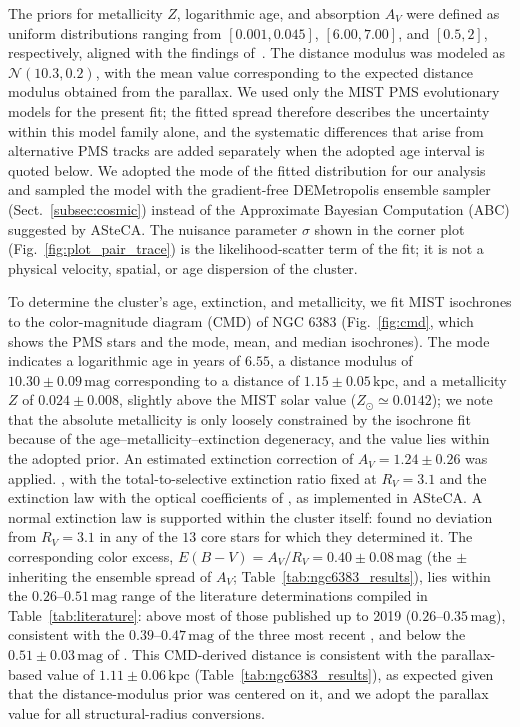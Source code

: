 \documentclass{aa}
\providecommand{\DIFaddtex}[1]{{\protect\color[rgb]{0,0,0.7}#1}} %
\providecommand{\DIFdeltex}[1]{{\protect\color[rgb]{0.65,0,0}\footnotesize #1}} %
\providecommand{\DIFaddbegin}{} %
\providecommand{\DIFaddend}{} %
\providecommand{\DIFdelbegin}{} %
\providecommand{\DIFdelend}{} %
\providecommand{\DIFadd}[1]{\texorpdfstring{\DIFaddtex{#1}}{#1}} %
\providecommand{\DIFdel}[1]{\texorpdfstring{\DIFdeltex{#1}}{}} %
\providecommand{\DIFscaledelfig}{0.5}
\newlength{\DIFdelgraphicswidth} %
\newlength{\DIFdelgraphicsheight} %
\providecommand{\DIFaddincludegraphics}[2][]{{\color{blue}\fbox{\DIFOincludegraphics[#1]{#2}}}} %
\providecommand{\DIFdelincludegraphics}[2][]{%
\sbox{\DIFdelgraphicsbox}{\DIFOincludegraphics[#1]{#2}}%
\settoboxwidth{\DIFdelgraphicswidth}{\DIFdelgraphicsbox} %
\settoboxtotalheight{\DIFdelgraphicsheight}{\DIFdelgraphicsbox} %
\scalebox{\DIFscaledelfig}{%
\parbox[b]{\DIFdelgraphicswidth}{\usebox{\DIFdelgraphicsbox}\\[-\baselineskip] \rule{\DIFdelgraphicswidth}{0em}}\llap{\resizebox{\DIFdelgraphicswidth}{\DIFdelgraphicsheight}{%
\setlength{\unitlength}{\DIFdelgraphicswidth}%
\begin{picture}(1,1)%
\thicklines\linethickness{2pt} %
{\color[rgb]{1,0,0}\put(0,0){\framebox(1,1){}}}%
{\color[rgb]{1,0,0}\put(0,0){\line( 1,1){1}}}%
{\color[rgb]{1,0,0}\put(0,1){\line(1,-1){1}}}%
\end{picture}%
}\hspace*{3pt}}} %
} %
\DeclareRobustCommand{\DIFaddbegin}{\DIFOaddbegin \let\includegraphics\DIFaddincludegraphics} %
\DeclareRobustCommand{\DIFaddend}{\DIFOaddend \let\includegraphics\DIFOincludegraphics} %
\DeclareRobustCommand{\DIFdelbegin}{\DIFOdelbegin \let\includegraphics\DIFdelincludegraphics} %
\DeclareRobustCommand{\DIFdelend}{\DIFOaddend \let\includegraphics\DIFOincludegraphics} %
\begin{document}
The priors for metallicity $Z$, logarithmic age, and absorption $A_V$ were defined as uniform distributions ranging from $[0.001, 0.045]$, $[6.00, 7.00]$, and $[0.5, 2]$, respectively, aligned with the findings of~\citep{2024arXiv240301030P}. The distance modulus was modeled as $\mathcal{N}(10.3, 0.2)$, with the mean value corresponding to the expected distance modulus obtained from the parallax. We used only the \textsc{MIST} PMS evolutionary models for the present fit; the fitted spread therefore describes the uncertainty within this model family alone, and the systematic differences that arise from alternative PMS tracks are added separately when the adopted age interval is quoted below. We adopted the mode of the fitted distribution for our analysis and sampled the model with the gradient-free DEMetropolis ensemble sampler (Sect.~\ref{subsec:cosmic}) instead of the Approximate Bayesian Computation (ABC) suggested by ASteCA\@. The nuisance parameter $\sigma$ shown in the corner plot (Fig.~\ref{fig:plot_pair_trace}) is the likelihood-scatter term of the fit; it is not a physical velocity, spatial, or age dispersion of the cluster.

To determine the cluster's age, extinction, and metallicity, we fit MIST isochrones to the color-magnitude diagram (CMD) of NGC 6383 (Fig.~\ref{fig:cmd}, which shows the PMS stars and the mode, mean, and median isochrones). The mode indicates a logarithmic age in years of $6.55$, a distance modulus of $10.30\pm 0.09\,\mathrm{mag}$ corresponding to a distance of $1.15\pm0.05\,\mathrm{kpc}$, and a metallicity $Z $ of $0.024 \pm 0.008$, slightly above the MIST solar value ($Z_\odot\simeq0.0142$); we note that the absolute metallicity is only loosely constrained by the isochrone fit because of the age--metallicity--extinction degeneracy, and the value lies within the adopted prior. An estimated extinction correction of $A_V = 1.24 \pm 0.26$ was applied\DIFdelbegin \DIFdel{. }\DIFdelend \DIFaddbegin \DIFadd{, with the total-to-selective extinction ratio fixed at $R_V = 3.1$ and the \citet{1989ApJ...345..245C} extinction law with the optical coefficients of \citet{1994ApJ...422..158O}, as implemented in ASteCA}\@\DIFadd{. A normal extinction law is supported within the cluster itself: \citet{2000AA...362..580V} found no deviation from $R_V = 3.1$ in any of the $13$ core stars for which they determined it. The corresponding color excess, $E(B-V) = A_V/R_V = 0.40 \pm 0.08\,\mathrm{mag}$ (the $\pm$ inheriting the ensemble spread of $A_V$; Table~\ref{tab:ngc6383_results}), lies within the $0.26$--$0.51\,\mathrm{mag}$ range of the literature determinations compiled in Table~\ref{tab:literature}: above most of those published up to 2019 ($0.26$--$0.35\,\mathrm{mag}$), consistent with the $0.39$--$0.47\,\mathrm{mag}$ of the three most recent \citep{2022ApJS..262....7H,2024arXiv240305143H,2024arXiv240301030P}, and below the $0.51 \pm 0.03\,\mathrm{mag}$ of \citet{2018AA...610A..30A}. }\DIFaddend This CMD-derived distance is consistent with the parallax-based value of $1.11 \pm 0.06\,\mathrm{kpc}$ (Table~\ref{tab:ngc6383_results}), as expected given that the distance-modulus prior was centered on it, and we adopt the parallax value for all structural-radius conversions.
\end{document}
